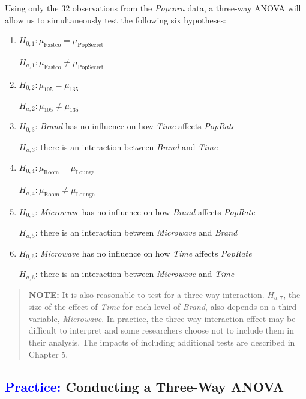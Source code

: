 \documentclass[
]{report}
\begin{document}
Using only the 32 observations from the \emph{Popcorn} data, a three-way ANOVA will allow us to simultaneously test the following six hypotheses:

\begin{enumerate}
\def\labelenumi{\arabic{enumi}.}
\item
  \(H_{0,1}: \mu_{\text{Fastco}} = \mu_{\text{PopSecret}}\)

  \(H_{a,1}: \mu_{\text{Fastco}} \ne \mu_{\text{PopSecret}}\)
\item
  \(H_{0,2}: \mu_{105} = \mu_{135}\)

  \(H_{a,2}: \mu_{105} \ne \mu_{135}\)
\item
  \(H_{0,3}\): \emph{Brand} has no influence on how \emph{Time} affects \emph{PopRate}

  \(H_{a,3}\): there is an interaction between \emph{Brand} and \emph{Time}
\item
  \(H_{0,4}: \mu_{\text{Room}} = \mu_{\text{Lounge}}\)

  \(H_{a,4}: \mu_{\text{Room}} \ne \mu_{\text{Lounge}}\)
\item
  \(H_{0,5}\): \emph{Microwave} has no influence on how \emph{Brand} affects \emph{PopRate}

  \(H_{a,5}\): there is an interaction between \emph{Microwave} and \emph{Brand}
\item
  \(H_{0,6}\): \emph{Microwave} has no influence on how \emph{Time} affects \emph{PopRate}

  \(H_{a,6}\): there is an interaction between \emph{Microwave} and \emph{Time}
\end{enumerate}

\begin{quote}
\textbf{NOTE:} It is also reasonable to test for a three-way interaction. \(\scriptstyle H_{a,7}\), the size of the effect of \emph{Time} for each level of \emph{Brand}, also depends on a third variable, \emph{Microwave}. In practice, the three-way interaction effect may be difficult to interpret and some researchers choose not to include them in their analysis. The impacts of including additional tests are described in Chapter 5.
\end{quote}

\hypertarget{conducting-a-three-way-anova}{%
\subsection*{\texorpdfstring{\textcolor{blue}{Practice:} Conducting a Three-Way ANOVA}{ Conducting a Three-Way ANOVA}}\label{conducting-a-three-way-anova}}
\end{document}
